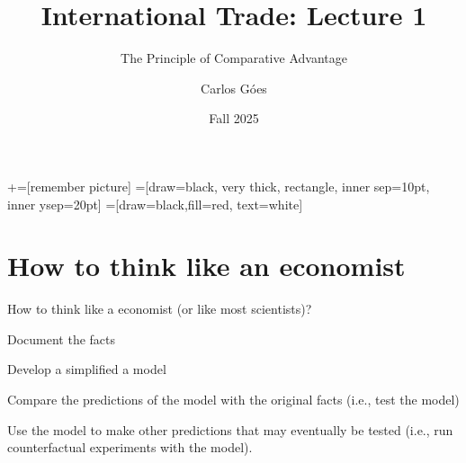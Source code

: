 \documentclass[notes,11pt, aspectratio=169, xcolor=table]{beamer}
\title[]{International Trade: Lecture 1}
\subtitle[]{The Principle of Comparative Advantage}
\author[Góes]
{Carlos Góes\inst{1}}
\date{Fall 2025}
\institute[GWU]{\inst{1} George Washington University }
\newenvironment{wideitemize}{\itemize\addtolength{\itemsep}{10pt}}{\enditemize}
\begin{document}
\newcommand\marktopleft[1]{%
    \tikz[overlay,remember picture] 
        \node (marker-#1-a) at (-.3em,.3em) {};%
}
\newcommand\markbottomright[2]{%
    \tikz[overlay,remember picture] 
        \node (marker-#1-b) at (0em,0em) {};%
}
+=[remember picture] 
 =[draw=black, very thick, rectangle, inner sep=10pt, inner ysep=20pt]
 =[draw=black,fill=red, text=white]















\frame{\titlepage}
\addtocounter{framenumber}{-1}





\section{How to think like an economist}

\begin{frame}{How to think like a economist  (or like most scientists)?}
 \begin{wideitemize}
    \item Document the facts
    \item Develop a simplified a model
    \item Compare the predictions of the model with the original facts (i.e., test the model)
    \item Use the model to make other predictions that may eventually be tested (i.e., run counterfactual experiments with the model).
 \end{wideitemize}
\end{frame}
\end{document}
